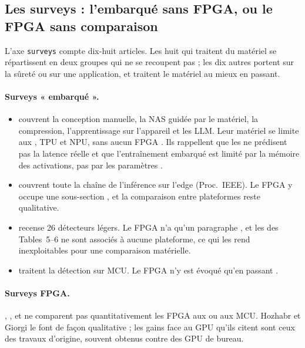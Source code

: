 \subsection{Les surveys : l'embarqué sans FPGA, ou le FPGA sans comparaison}

L'axe \texttt{surveys} compte dix-huit articles. Les huit qui traitent du matériel se
répartissent en deux groupes qui ne se recoupent pas ; les dix autres portent sur la sûreté
ou sur une application, et traitent le matériel au mieux en passant.

\paragraph{Surveys « embarqué ».}
\begin{itemize}
  \item \citet{arxiv-2411.01431-efficient-deep-learning-infrastructures-embedded} couvrent
    la conception manuelle, la NAS guidée par le matériel, la compression, l'apprentissage
    sur l'appareil et les LLM. Leur matériel se limite aux , TPU et NPU, sans aucun
    FPGA . Ils rappellent que les  ne prédisent pas la latence réelle
     et que l'entraînement embarqué est limité par la mémoire des activations,
    pas par les paramètres .
  \item \citet{2023-shuvo-efficient-acceleration-deep-learning-inference} couvrent toute la
    chaîne de l'inférence sur l'edge (Proc.\ IEEE). Le FPGA y occupe une sous-section
    , et la comparaison entre plateformes reste qualitative.
  \item \citet{2024-mittal-comprehensive-survey-deep-learning-lightweight} recense 26
    détecteurs légers. Le FPGA n'a qu'un paragraphe , et les  des
    Tables~5--6 ne sont associés à aucune plateforme, ce qui les rend inexploitables pour
    une comparaison matérielle.
  \item \citet{2025-el-zeinaty-designing-object-detection-models-tinyml} traitent la
    détection sur MCU. Le FPGA n'y est évoqué qu'en passant .
\end{itemize}

\paragraph{Surveys FPGA.}
\citet{2025-hozhabr-survey-real-time-object-detection},
\citet{arxiv-2509.04153-real-time-fpga-cnns-detection}\pp{},
\citet{arxiv-1806.01683-accelerating-cnn-inference-fpgas-survey}\pp{} et
\citet{2018-venieris-toolflows-mapping-convolutional-neural-networks} ne comparent pas
quantitativement les FPGA aux  ou aux MCU. Hozhabr et Giorgi le font de façon
qualitative  ; les gains face au GPU qu'ils citent sont ceux des travaux
d'origine, souvent obtenus contre des GPU de bureau.

